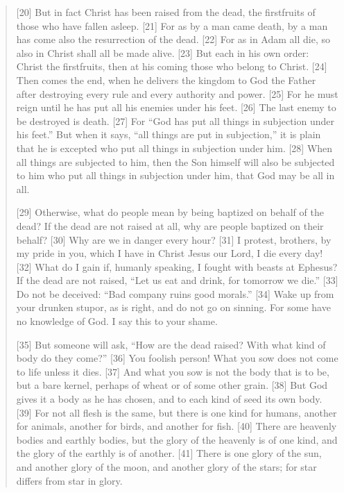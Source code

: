 \begin{quote}
    [20] But in fact Christ has been raised from the dead, the firstfruits of those who have fallen asleep. [21] For as by a man came death, by a man has come also the resurrection of the dead. [22] For as in Adam all die, so also in Christ shall all be made alive. [23] But each in his own order: Christ the firstfruits, then at his coming those who belong to Christ. [24] Then comes the end, when he delivers the kingdom to God the Father after destroying every rule and every authority and power. [25] For he must reign until he has put all his enemies under his feet. [26] The last enemy to be destroyed is death. [27] For “God has put all things in subjection under his feet.” But when it says, “all things are put in subjection,” it is plain that he is excepted who put all things in subjection under him. [28] When all things are subjected to him, then the Son himself will also be subjected to him who put all things in subjection under him, that God may be all in all.

    [29] Otherwise, what do people mean by being baptized on behalf of the dead? If the dead are not raised at all, why are people baptized on their behalf? [30] Why are we in danger every hour? [31] I protest, brothers, by my pride in you, which I have in Christ Jesus our Lord, I die every day! [32] What do I gain if, humanly speaking, I fought with beasts at Ephesus? If the dead are not raised, “Let us eat and drink, for tomorrow we die.” [33] Do not be deceived: “Bad company ruins good morals.” [34] Wake up from your drunken stupor, as is right, and do not go on sinning. For some have no knowledge of God. I say this to your shame.

    [35] But someone will ask, “How are the dead raised? With what kind of body do they come?” [36] You foolish person! What you sow does not come to life unless it dies. [37] And what you sow is not the body that is to be, but a bare kernel, perhaps of wheat or of some other grain. [38] But God gives it a body as he has chosen, and to each kind of seed its own body. [39] For not all flesh is the same, but there is one kind for humans, another for animals, another for birds, and another for fish. [40] There are heavenly bodies and earthly bodies, but the glory of the heavenly is of one kind, and the glory of the earthly is of another. [41] There is one glory of the sun, and another glory of the moon, and another glory of the stars; for star differs from star in glory.


\end{quote}
